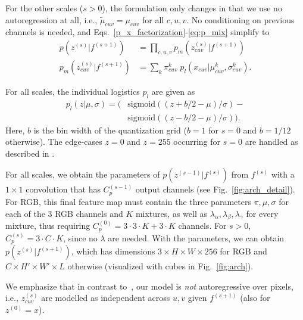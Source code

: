 \documentclass[10pt,twocolumn,letterpaper]{article}
\newcommand{\sigmoid}{\text{sigmoid}}
\newcommand{\pmix}{p_m}
\newcommand{\plogistic}{p_l}
\begin{document}
For the other scales ($s>0$), the formulation only changes in that we use no autoregression at all, i.e., $\tilde \mu_{cuv} = \mu_{cuv}$ for all $c, u, v$. 
No conditioning on previous channels is needed, and Eqs.~\eqref{p_x_factorization}-\eqref{eq:p_mix} simplify to
\begin{align}
    p(z^{(s)} | f^{(s+1)}) &= \prod_{c,u,v} \pmix(z^{(s)}_{cuv} | f^{(s+1)}) \\
    \pmix(z^{(s)}_{cuv} | f^{(s+1)}) &= \sum_k \pi^k_{cuv} \; \plogistic(x_{cuv} | \mu^k_{cuv}, \sigma^k_{cuv}). \label{eq:p_mix_others}
\end{align}

For all scales, the individual logistics $\plogistic$ are given as 
\begin{align}
    \plogistic(z | \mu, \sigma) = \bigl(&\sigmoid((z + b/2 - \mu) / \sigma) - \nonumber \\&\sigmoid((z - b/2 - \mu) / \sigma) \bigr). \label{eq:plog}
\end{align}
Here, $b$ is the bin width of the quantization grid ($b=1$ for $s=0$ and $b=1/12$ otherwise). The edge-cases $z=0$ and $z=255$ occurring for $s=0$ are handled as described in \cite[Sec. 2.1]{Salimans2017pcnnpp}.

For all scales, we obtain the parameters of $p(z^{(s-1)}|f^{(s)})$ from $f^{(s)}$ with a $1{\times}1$ convolution that has $C_p^{(s-1)}$ output channels (see Fig.~\ref{fig:arch_detail}).
For RGB, this final feature map must contain the three parameters $\pi, \mu, \sigma$ for each of the 3 RGB channels and $K$ mixtures, as well as $\lambda_\alpha, \lambda_\beta, \lambda_\gamma$ for every mixture, thus requiring $C_p^{(0)} = 3 \cdot 3 \cdot K + 3 \cdot K$  channels. For $s>0$, $C_p^{(s)} = 3 \cdot C \cdot K$, since no $\lambda$ are needed.
With the parameters, we can obtain $p(z^{(s)}|f^{(s+1)})$, which has dimensions $3{\times}H{\times}W{\times}256$ for RGB and $C{\times}H'{\times}W'{\times}L$ otherwise (visualized with cubes in Fig.~\ref{fig:arch}).


We emphasize that in contrast to~\cite{Salimans2017pcnnpp}, our model is \emph{not} autoregressive over pixels, i.e., $z_{cuv}^{(s)}$ are modelled as independent across $u, v$ given $f^{(s+1)}$ (also for $z^{(0)}=x$).
\end{document}
